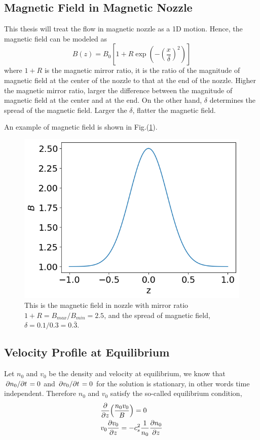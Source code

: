 \subsection{Magnetic Field in Magnetic Nozzle} \label{sec:magnetic-field-in-nozzle}
This thesis will treat the flow in magnetic nozzle as a 1D motion. Hence, the magnetic field can be modeled as 
\[ B(z) = B_0 \left[1 + R\exp(-\left(\frac{x}{\delta}\right)^2)\right] \]
where $1+R$ is the magnetic mirror ratio, it is the ratio of the magnitude of magnetic field at the center of the nozzle to that at the end of the nozzle. Higher the magnetic mirror ratio, larger the difference between the magnitude of magnetic field at the center and at the end. On the other hand, $\delta$ determines the spread of the magnetic field. Larger the $\delta$, flatter the magnetic field. 

An example of magnetic field is shown in Fig.(\ref{fig:magnetic-field}).
\begin{figure}[H]
	\centering 
	\includegraphics[width=0.7\linewidth]{img/introduction/magnetic-field}
	\caption{This is the magnetic field in nozzle with mirror ratio $1+R=B_{max}/B_{min}=2.5$, and the spread of magnetic field, $\delta=0.1/0.3=0.\bar{3}$. }
	\label{fig:magnetic-field}
\end{figure}


\subsection{Velocity Profile at Equilibrium}
Let $n_0$ and $v_0$ be the density and velocity at equilibrium, we know that $\pdv*{n_0}{t}=0$ and $\pdv*{v_0}{t}=0$ for the solution is stationary, in other words time independent. Therefore $n_0$ and $v_0$ satisfy the so-called equilibrium condition,
\begin{align*}
	&\pdv{z}(\frac{n_0v_0}{B}) = 0 \\
	&v_0\pdv{v_0}{z} = -c_s^2\frac{1}{n_0}\pdv{n_0}{z} 
\end{align*}

